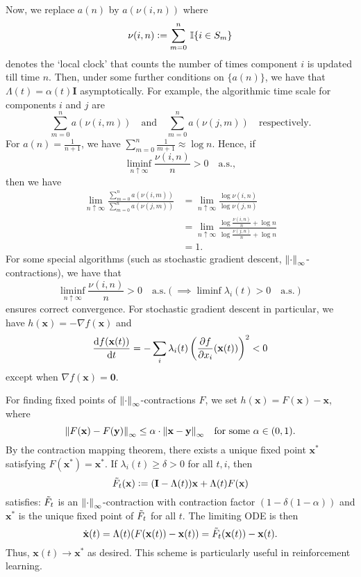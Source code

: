Now, we replace $a(n)$ by $a(\nu(i,n))$ where
\[
    \nu(i,n) \vcentcolon= \sum_{m=0}^n\, \mathbb{I}\{i \in S_m\}
\]
denotes the `local clock' that counts the number of times component $i$ is updated till time $n$. Then, under some further conditions on $\{a(n)\}$, we have that $\Lambda(t) = \alpha(t) \mathbf{I}$ asymptotically. For example, the algorithmic time scale for components $i$ and $j$ are
\[
    \sum_{m=0}^n a(\nu(i,m)) \quad \text{and} \quad \sum_{m=0}^n a(\nu(j,m)) \quad \text{respectively.}
\]
For $a(n) = \frac{1}{n+1}$, we have $\sum_{m=0}^n \frac{1}{m+1} \approx \log n$. Hence, if 
\[
    \liminf_{n \uparrow \infty} \frac{\nu(i,n)}{n} > 0 \quad \text{a.s.},
\]
then we have
\begin{align*}
    \lim_{n \uparrow \infty} \frac{\sum_{m=0}^n a(\nu(i,m))}{\sum_{m=0}^n a(\nu(j,m))} &= \lim_{n \uparrow \infty} \frac{\log \nu(i,n)}{\log \nu(j,n)} \\
    &= \lim_{n \uparrow \infty} \frac{\log \frac{\nu(i,n)}{n} + \log n}{\log \frac{\nu(j,n)}{n} + \log n} \\
    &= 1.
\end{align*}
For some special algorithms (such as stochastic gradient descent, $\norm{\cdot}_{\infty}$-contractions), we have that
\[
    \liminf_{n \uparrow \infty} \frac{\nu(i,n)}{n} > 0 \quad \text{a.s.} \left( \implies \liminf \lambda_i(t) > 0 \quad \text{a.s.} \right)
\]
ensures correct convergence. For stochastic gradient descent in particular, we have $h(\mathbf{x}) = -\nabla f(\mathbf{x})$ and
\[
    \frac{\mathrm{d} f(\mathbf{x}(t))}{\mathrm{d} t} = -\sum_i \lambda_i(t) \left( \frac{\partial f}{\partial x_i}(\mathbf{x}(t)) \right)^2 < 0
\]
except when $\nabla f(\mathbf{x}) = \mathbf{0}$.

For finding fixed points of $\norm{\cdot}_{\infty}$-contractions $F$, we set $h(\mathbf{x}) = F(\mathbf{x}) - \mathbf{x}$, where
\[
    \norm{F(\mathbf{x}) - F(\mathbf{y})}_{\infty} \leq \alpha \cdot \norm{\mathbf{x} - \mathbf{y}}_{\infty} \quad \text{for some } \alpha \in (0,1). 
\]
By the contraction mapping theorem, there exists a unique fixed point $\mathbf{x}^*$ satisfying $F(\mathbf{x}^*) = \mathbf{x}^*$. If $\lambda_i(t) \geq \delta > 0$ for all $t,i$, then
\[
    \Tilde{F}_t(\mathbf{x}) \vcentcolon= (\mathbf{I} - \Lambda(t))\mathbf{x} + \Lambda(t)F(\mathbf{x})
\]
satisfies: $\Tilde{F}_t$ is an $\norm{\cdot}_{\infty}$-contraction with contraction factor $(1-\delta(1-\alpha))$ and $\mathbf{x}^*$ is the unique fixed point of $\Tilde{F}_t$ for all $t$. The limiting ODE is then
\[
    \dot{\mathbf{x}}(t) = \Lambda(t) (F(\mathbf{x}(t)) - \mathbf{x}(t)) = \Tilde{F}_t(\mathbf{x}(t)) - \mathbf{x}(t).
\]
Thus, $\mathbf{x}(t) \to \mathbf{x}^*$ as desired. This scheme is particularly useful in reinforcement learning. 

